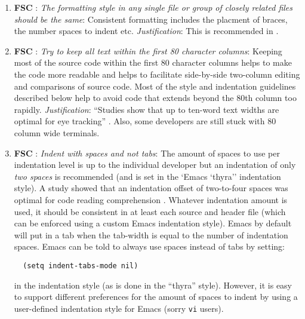 \begin{enumerate}

{}\item{}\textbf{FSC }:
{}\textit{The formatting style in any single file or group of closely
related files should be the same}: Consistent formatting includes the placment
of braces, the number spaces to indent etc.  {}\textit{Justification}: This is
recommended in {}\cite[Item 0]{C++CodingStandards05}.

{}\item{}\textbf{FSC }:
{}\textit{Try to keep all text within the first 80 character columns}:
Keeping most of the source code within the first 80 character columns helps to
make the code more readable and helps to facilitate side-by-side two-column
editing and comparisons of source code.  Most of the style and indentation
guidelines described below help to avoid code that extends beyond the 80th
column too rapidly. {}\textit{Justification}: ``Studies show that up to
ten-word text widths are optimal for eye tracking'' {}\cite[Item
0]{C++CodingStandards05}.  Also, some developers are still stuck with 80
column wide terminals.

{}\item{}\textbf{FSC }:
{}\textit{Indent with spaces and not tabs}: The amount of spaces to use
per indentation level is up to the individual developer but an indentation of
only {}\textit{two spaces} is recommended (and is set in the `Emacs `thyra''
indentation style).  A study showed that an indentation offset of two-to-four
spaces was optimal for code reading comprehension {}\cite[Section
31.2]{CodeComplete2nd04}.  Whatever indentation amount is used, it should be
consistent in at least each source and header file {}\cite[Item
0]{C++CodingStandards05} (which can be enforced using a custom Emacs
indentation style).  Emacs by default will put in a tab when the tab-width is
equal to the number of indentation spaces.  Emacs can be told to always use
spaces instead of tabs by setting:

{\small\begin{verbatim}
  (setq indent-tabs-mode nil)
\end{verbatim}}

in the indentation style (as is done in the ``thyra'' style).  However, it is
easy to support different preferences for the amount of spaces to indent by
using a user-defined indentation style for Emacs (sorry {}\texttt{vi} users).


\end{enumerate}
